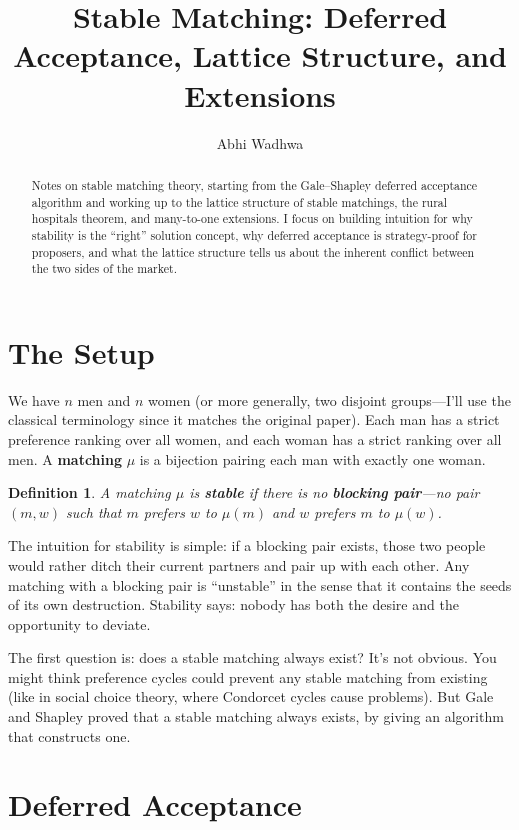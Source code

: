 \documentclass[11pt]{article}
\title{Stable Matching: Deferred Acceptance, Lattice Structure, and Extensions}
\author{Abhi Wadhwa}
\date{}
\newtheorem{definition}{Definition}
\begin{document}
\maketitle

\begin{abstract}
Notes on stable matching theory, starting from the Gale--Shapley deferred acceptance algorithm and working up to the lattice structure of stable matchings, the rural hospitals theorem, and many-to-one extensions. I focus on building intuition for why stability is the ``right'' solution concept, why deferred acceptance is strategy-proof for proposers, and what the lattice structure tells us about the inherent conflict between the two sides of the market.
\end{abstract}

\section{The Setup}

We have $n$ men and $n$ women (or more generally, two disjoint groups---I'll use the classical terminology since it matches the original paper). Each man has a strict preference ranking over all women, and each woman has a strict ranking over all men. A \textbf{matching} $\mu$ is a bijection pairing each man with exactly one woman.

\begin{definition}
A matching $\mu$ is \textbf{stable} if there is no \textbf{blocking pair}---no pair $(m, w)$ such that $m$ prefers $w$ to $\mu(m)$ and $w$ prefers $m$ to $\mu(w)$.
\end{definition}

The intuition for stability is simple: if a blocking pair exists, those two people would rather ditch their current partners and pair up with each other. Any matching with a blocking pair is ``unstable'' in the sense that it contains the seeds of its own destruction. Stability says: nobody has both the desire and the opportunity to deviate.

The first question is: does a stable matching always exist? It's not obvious. You might think preference cycles could prevent any stable matching from existing (like in social choice theory, where Condorcet cycles cause problems). But Gale and Shapley \cite{galeshapley1962} proved that a stable matching always exists, by giving an algorithm that constructs one.

\section{Deferred Acceptance}
\end{document}
